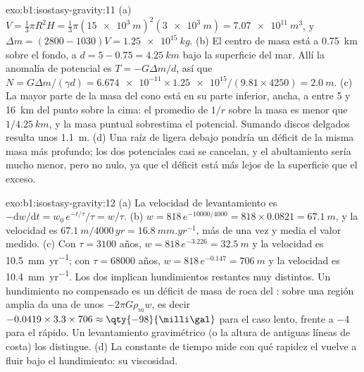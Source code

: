 \begin{solution}{exo:b1:isostasy-gravity:11}
(a) $V = \tfrac13\pi R^2 H = \tfrac13\pi(\qty{15e3}{m})^2(\qty{3e3}{m}) =
\qty{7.07e11}{m^3}$, y $\Delta m = (2800 - 1030)V = \qty{1.25e15}{kg}$.
(b) El centro de masa está a \qty{0.75}{km} sobre el fondo, a
$d = 5 - 0.75 = \qty{4.25}{km}$ bajo la superficie del mar. Allí la anomalía de potencial es
$T = -G\Delta m/d$, así que $N = G\Delta m/(\gamma d) =
\num{6.674e-11}\times\num{1.25e15}/(9.81\times4250) = \qty{2.0}{m}$.
(c) La mayor parte de la masa del cono está en su parte inferior, ancha, a entre 5 y
\qty{16}{km} del punto sobre la cima: el promedio de $1/r$ sobre la masa es menor que
$1/\qty{4.25}{km}$, y la masa puntual sobrestima el potencial. Sumando discos delgados resulta
unos \qty{1.1}{m}.
(d) Una raíz de  ligera debajo pondría un déficit de la misma masa más profundo;
los dos potenciales casi se cancelan, y el abultamiento sería mucho menor, pero no nulo,
ya que el déficit está más lejos de la superficie que el exceso.
\end{solution}

\begin{solution}{exo:b1:isostasy-gravity:12}
(a) La velocidad de levantamiento es $-\mathrm dw/\mathrm dt = w_0\,e^{-t/\tau}/\tau = w/\tau$.
(b) $w = 818\,e^{-10000/4000} = 818\times0.0821 = \qty{67.1}{m}$, y la velocidad es
$\qty{67.1}{m}/\num{4000}\,\unit{yr} = \qty{16.8}{mm.yr^{-1}}$, más de una vez y
media el valor medido. (c) Con $\tau = 3100$ años, $w =
818\,e^{-3.226} = \qty{32.5}{m}$ y la velocidad es \qty{10.5}{mm.yr^{-1}}; con
$\tau = \num{68000}$ años, $w = 818\,e^{-0.147} = \qty{706}{m}$ y la velocidad
es \qty{10.4}{mm.yr^{-1}}. Los dos implican hundimientos restantes muy distintos.
Un hundimiento no compensado es un déficit de masa de roca del : sobre una región amplia
da una  de unos $-2\pi G\rho_m w$, es decir
$-0.0419\times3.3\times706 \approx \qty{-98}{\milli\gal}$ para el caso lento,
frente a \qty{-4}{\milli\gal} para el rápido. Un levantamiento gravimétrico (o la altura de
antiguas líneas de costa) los distingue. (d) La constante de tiempo mide con qué rapidez
el  vuelve a fluir bajo el hundimiento: su viscosidad.
\end{solution}

